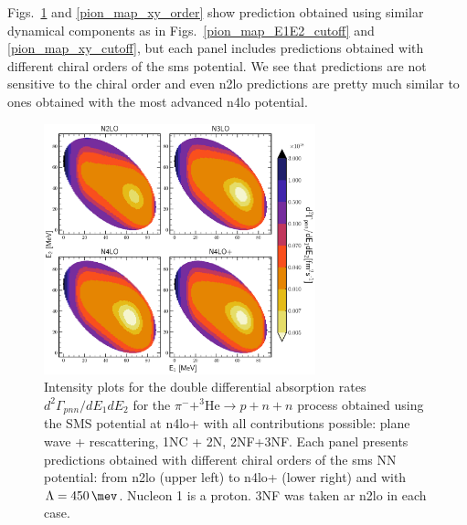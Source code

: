     Figs.~\ref{pion_map_E1E2_order} and \ref{pion_map_xy_order} show prediction obtained using similar
    dynamical components
    as in Figs.~\ref{pion_map_E1E2_cutoff} and \ref{pion_map_xy_cutoff}, but each panel includes
    predictions obtained with different chiral orders of the \gls{sms} potential.
    We see that predictions are not sensitive to the chiral order and even \gls{n2lo} predictions
    are pretty much similar to ones obtained with the most advanced \gls{n4lo} potential.
     
    
    \begin{figure}[h]
        \begin{center}
            \includegraphics[width=0.7\textwidth]{PlotData/PION/Dalitz_maps/figures/Dalitz_map_pnn_E1E2_orders.pdf}
        \end{center}
        \caption{Intensity plots for the double differential absorption rates
        $d^2 \Gamma_{pnn}/dE_1dE_2$ for the $\pi^- + ^3\text{He} \rightarrow p + n + n$
        process obtained using the SMS potential at \gls{n4lo+}
        with all contributions possible: plane wave + rescattering, 1NC + 2N, 2NF+3NF.
        Each panel presents predictions obtained with different chiral orders of the \gls{sms} NN potential:
        from \gls{n2lo} (upper left) to \gls{n4lo+} (lower right) and with $\Lambda = \SI{450}{\mev}$.
        Nucleon 1 is a proton. 3NF was taken ar \gls{n2lo} in each case.}
        \label{pion_map_E1E2_order}
    \end{figure}

